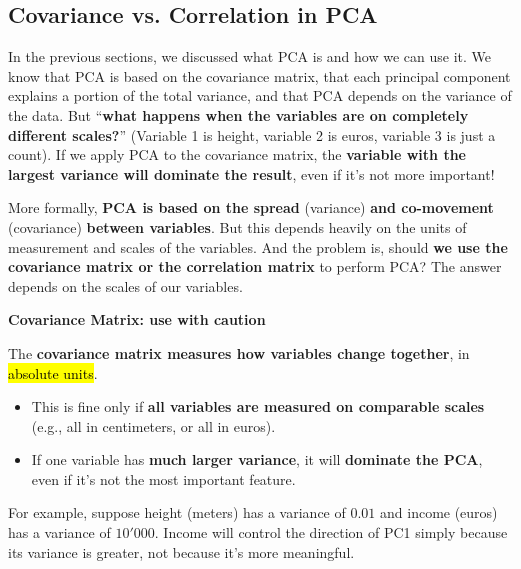 \subsection{Covariance vs. Correlation in PCA}

In the previous sections, we discussed what PCA is and how we can use it. We know that PCA is based on the covariance matrix, that each principal component explains a portion of the total variance, and that PCA depends on the variance of the data. But ``\textbf{what happens when the variables are on completely different scales?}'' (Variable 1 is height, variable 2 is euros, variable 3 is just a count). If we apply PCA to the covariance matrix, the \textbf{variable with the largest variance will dominate the result}, even if it's not more important!

\highspace
More formally, \textbf{PCA is based on the spread} (variance) \textbf{and co-movement} (covariance) \textbf{between variables}. But this depends heavily on the units of measurement and scales of the variables. And the problem is, should \textbf{we use the covariance matrix or the correlation matrix} to perform PCA? The answer depends on the scales of our variables.

\highspace
\begin{flushleft}
    \textcolor{Red2}{ \textbf{Covariance Matrix: use with caution}}
\end{flushleft}
The \textbf{covariance matrix measures how variables change together}, in \hl{absolute units}.
\begin{itemize}
    \item[\textcolor{Green3}{\faIcon{check}}] This is fine only if \textbf{all variables are measured on comparable scales} (e.g., all in centimeters, or all in euros).

    \item[\textcolor{Red2}{\faIcon{times}}] If one variable has \textbf{much larger variance}, it will \textbf{dominate the PCA}, even if it's not the most important feature.
\end{itemize}
For example, suppose height (meters) has a variance of $0.01$ and income (euros) has a variance of $10'000$. Income will control the direction of PC1 simply because its variance is greater, not because it's more meaningful.

